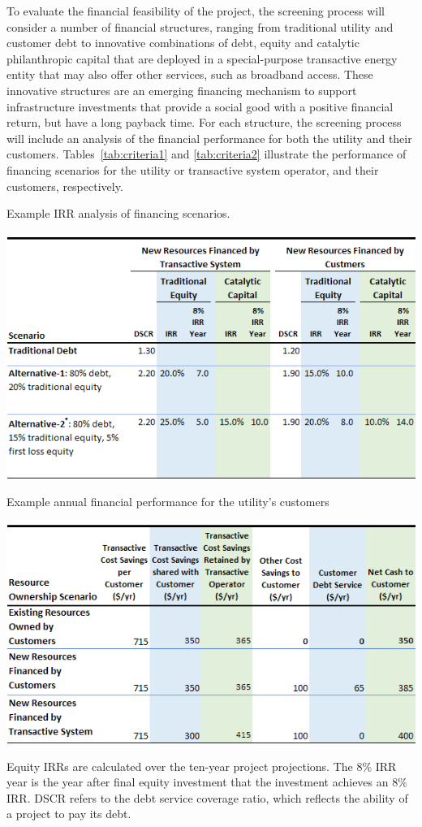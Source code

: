 To evaluate the financial feasibility of the project, the screening process will consider a number of financial structures, ranging from traditional utility and customer debt to innovative combinations of debt, equity and catalytic philanthropic capital that are deployed in a special-purpose transactive energy entity that may also offer other services, such as broadband access. These innovative structures are an emerging financing mechanism to support infrastructure investments that provide a social good with a positive financial return, but have a long payback time. For each structure, the screening process will include an analysis of the financial performance for both the utility and their customers. Tables~\ref{tab:criteria1} and \ref{tab:criteria2} illustrate the performance of financing scenarios for the utility or transactive system operator, and their customers, respectively.  
\begin{table}[!t]
    \centering
    \caption{Example IRR analysis of financing scenarios.}
    \label{tab:criteria1}
    \includegraphics[width=\columnwidth]{tess_table_2.png}
\end{table}
\begin{table}[!t]
    \centering
    \caption{Example annual financial performance for the utility's customers}
    \label{tab:criteria2}
    \includegraphics[width=\columnwidth]{tess_table_3.png}
\end{table}
Equity IRRs are calculated over the ten-year project projections.  The 8\% IRR year is the year after final equity investment that the investment achieves an 8\% IRR. DSCR refers to the debt service coverage ratio, which reflects the ability of a project to pay its debt.

